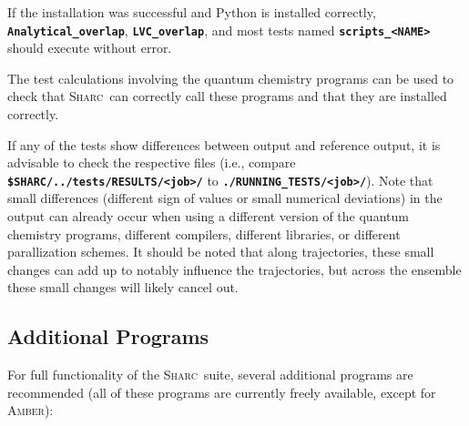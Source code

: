 \documentclass[a4paper,10pt,DIV=15,openany]{scrbook}
\newcommand{\sharc}{\textsc{Sharc}}
\newcommand{\ttt}[1]{\textbf{\texttt{#1}}}
\begin{document}
If the installation was successful and Python is installed correctly, \ttt{Analytical\_overlap}, \ttt{LVC\_overlap}, and most tests named \ttt{scripts\_<NAME>} should execute without error. 

The test calculations involving the quantum chemistry programs can be used to check that \sharc\ can correctly call these programs and that they are installed correctly.

If any of the tests show differences between output and reference output, it is advisable to check the respective files (i.e., compare \ttt{\$SHARC/../tests/RESULTS/<job>/} to \ttt{./RUNNING\_TESTS/<job>/}). Note that small differences (different sign of values or small numerical deviations) in the output can already occur when using a different version of the quantum chemistry programs, different compilers, different libraries, or different parallization schemes.
It should be noted that along trajectories, these small changes can add up to notably influence the trajectories, but across the ensemble these small changes will likely cancel out.


\subsection{Additional Programs}

For full functionality of the \sharc\ suite, several additional programs are recommended (all of these programs are currently freely available, except for \textsc{Amber}):
\end{document}
